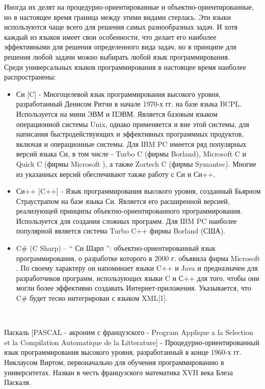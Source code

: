 Иногда их делят на процедурно-ориентированные и объектно-ориентированные, но в настоящее время граница между этими видами стерлась. Эти языки используются чаще всего для решения самых разнообразных задач. И хотя каждый из языков имеет свои особенности, что делает его наиболее эффективными для решения определенного вида задач, но в принципе для решения любой задачи можно выбирать любой язык программирования. \\

Среди универсальных языков программирования в настоящее время наиболее распространены: \\


\begin{itemize}
  \item Си [C] - Многоцелевой язык программирования высокого уровня, разработанный Денисом Ритчи в начале 1970-х гг. на базе языка BCPL. Используется на мини ЭВМ и ПЭВМ. Является базовым языком операционной системы Unix, однако применяется и вне этой системы, для написания быстродействующих и эффективных программных продуктов, включая и операционные системы. Для IBM PC имеется ряд популярных версий языка Си, в том числе - Turbo C (фирмы Borland), Microsoft C и Quick C (фирмы Microsoft ), а также Zortech C (фирмы Symantec). Многие из указанных версий обеспечивают также работу с Си и Си++.
  \item Си++ [C++] - Язык программирования высокого уровня, созданный Бьярном Страустрапом на базе языка Си. Является его расширенной версией, реализующей принципы объектно-ориентированного программирования. Используется для создания сложных программ. Для IBM PC наиболее популярной является система Turbo C++ фирмы Borland (США).
  \item C\# (C Sharp) – “ Си Шарп ”: объектно-ориентированный язык программирования, о разработке которого в 2000 г. объявила фирма Microsoft . По своему характеру он напоминает языки C++ и Java и предназначен для разработчиков программ, использующих языки C и С++ для того, чтобы они могли более эффективно создавать Интернет-приложения. Указывается, что C\# будет тесно интегрирован с языком XML[1].
\end{itemize}
\


Паскаль [PASCAL - акроним с французского - Program Applique a la Selection et la Compilation Automatique de la Litterature] - Процедурно-ориентированный язык программирования высокого уровня, разработанный в конце 1960-х гг. Никлаусом Виртом, первоначально для обучения программированию в университетах. Назван в честь французского математика XVII века Блеза Паскаля. \\

